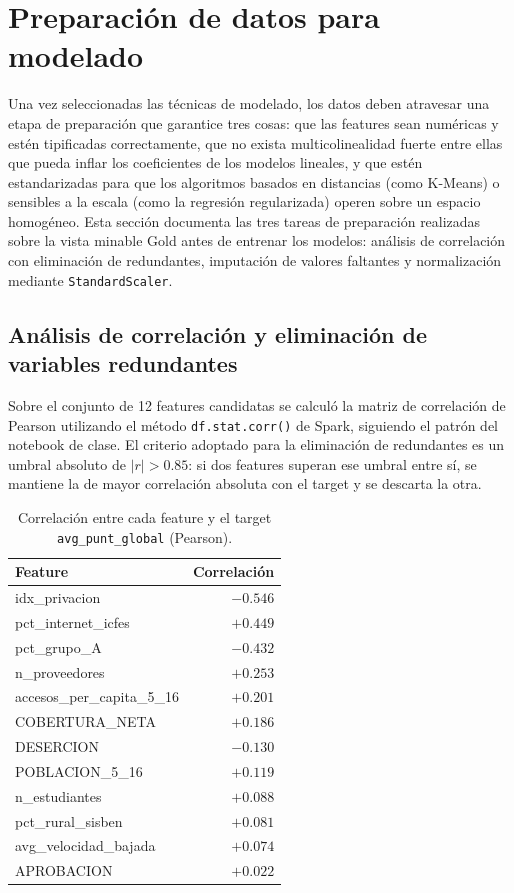 \section{Preparación de datos para modelado}
Una vez seleccionadas las técnicas de modelado, los datos deben atravesar una etapa de preparación que garantice tres cosas: que las features sean numéricas y estén tipificadas correctamente, que no exista multicolinealidad fuerte entre ellas que pueda inflar los coeficientes de los modelos lineales, y que estén estandarizadas para que los algoritmos basados en distancias (como K-Means) o sensibles a la escala (como la regresión regularizada) operen sobre un espacio homogéneo. Esta sección documenta las tres tareas de preparación realizadas sobre la vista minable Gold antes de entrenar los modelos: análisis de correlación con eliminación de redundantes, imputación de valores faltantes y normalización mediante \texttt{StandardScaler}.

\subsection{Análisis de correlación y eliminación de variables redundantes}
Sobre el conjunto de 12 features candidatas se calculó la matriz de correlación de Pearson utilizando el método \texttt{df.stat.corr()} de Spark, siguiendo el patrón del notebook de clase. El criterio adoptado para la eliminación de redundantes es un umbral absoluto de $|r| > 0.85$: si dos features superan ese umbral entre sí, se mantiene la de mayor correlación absoluta con el target y se descarta la otra.

\begin{table}[H]
\centering
\caption{Correlación entre cada feature y el target \texttt{avg\_punt\_global} (Pearson).}
\begin{tabular}{l r}
\toprule
\textbf{Feature} & \textbf{Correlación} \\
\midrule
idx\_privacion              & $-0.546$ \\
pct\_internet\_icfes         & $+0.449$ \\
pct\_grupo\_A                & $-0.432$ \\
n\_proveedores               & $+0.253$ \\
accesos\_per\_capita\_5\_16  & $+0.201$ \\
COBERTURA\_NETA              & $+0.186$ \\
DESERCION                    & $-0.130$ \\
POBLACION\_5\_16             & $+0.119$ \\
n\_estudiantes               & $+0.088$ \\
pct\_rural\_sisben           & $+0.081$ \\
avg\_velocidad\_bajada       & $+0.074$ \\
APROBACION                   & $+0.022$ \\
\bottomrule
\end{tabular}
\end{table}

